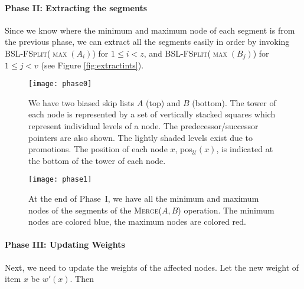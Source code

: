 \documentclass[11pt]{article}
\newcommand{\kwUnion}{Merge}
\newcommand{\Unionx}[2]{\mbox{\textsc{\kwUnion(\ensuremath{#1,#2})}}}
\newcommand{\Bslfsplx}[1]{\mbox{\textsc{BSL-FSplit(\ensuremath{#1})}}}
\newcommand{\segments}{{\segment}s}
\newcommand{\segment}{segment}
\newcommand{\lasta}{z}
\newcommand{\lastb}{v}
\newcommand{\universe}{\ensuremath{\mathcal U}}
\newcommand{\intmax}[1]{\ensuremath{\max(\intl #1)}}
\newcommand{\intl}[1]{\ensuremath{#1}}
\newcommand{\nodenewweight}[1]{{\ensuremath{w'(\node #1)}}}
\newcommand{\node}[1]{\ensuremath{#1}}
\newcommand{\nodeposition}[2]{pos\ensuremath{_{\set #1}(\node #2)}}
\newcommand{\set}[1]{\ensuremath{#1}}
\newcommand{\bsl}[1]{\ensuremath{#1}}
\begin{document}
\paragraph{Phase II: Extracting the \segments{}} 

Since we know where the minimum and maximum node of each \segment{} is from the previous phase, we can extract all the \segments{} easily in order by invoking \Bslfsplx{\intmax{A_i}} for $1\leq i< \lasta$, and \Bslfsplx{\intmax{B_j}} for $1\leq j< \lastb$ (see Figure \ref{fig:extractints}). 



\begin{figure}[H]
\centering 
\texttt{[image: phase0]} 
\caption{We have two biased skip lists \bsl A (top) and \bsl B (bottom). The tower of each node is represented by a set of vertically stacked squares which represent individual levels of a node. The predecessor/successor pointers are also shown. The lightly shaded levels exist due to promotions. The position of each node \node x, \nodeposition{\universe}{x}, is indicated at the bottom of the tower of each node.} 
\label{fig:example} 
\end{figure}
\begin{figure}[H]
\centering 
\texttt{[image: phase1]} 
\caption{At the end of Phase~I, we have all the minimum and maximum nodes of the \segments{} of the \Unionx{A}{B} operation. The minimum nodes are colored blue, the maximum nodes are colored red.} 
\label{fig:findints} 
\end{figure}




\paragraph{Phase III: Updating Weights} Next, we need to update the weights of the affected nodes. Let the new weight of item $x$ be $\nodenewweight x$. Then 
\end{document}
